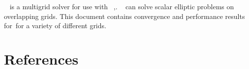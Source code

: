 \documentclass{article}
\begin{document}
\Ogmg~ is a multigrid solver for use with \Overture~\cite{overset96},\cite{OGES}.
\Ogmg~ can solve scalar elliptic problems
on overlapping grids. This document contains convergence and performance results for~\Ogmg for a variety
of different grids.






\clearpage
\section{References}




% 



\printindex
\end{document}
